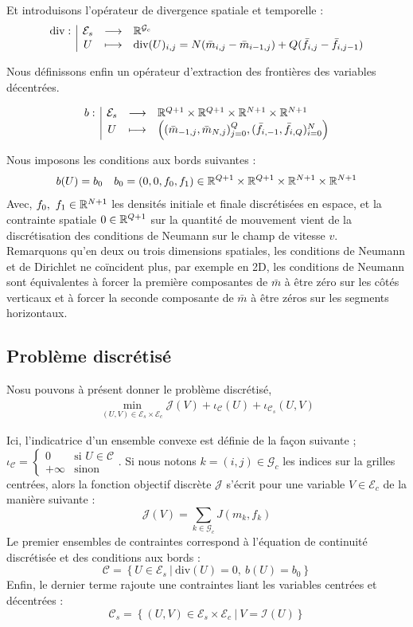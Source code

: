 \documentclass[a4paper,12pt]{article}
\renewcommand{\div}{\text{div}}
\begin{document}
Et introduisons l'opérateur de divergence spatiale et temporelle : 
\begin{align}
\fonction{\div}{\mathcal{E}_s}{\RR^{\mathcal{G}_c}}{U}{\div(U)_{i,j} = N(\bar{m}_{i,j} - \bar{m}_{i-1,j}) + Q(\bar{f}_{i,j} - \bar{f}_{i,j-1})
}
\end{align}

Nous définissons enfin un opérateur d'extraction des frontières des variables décentrées. 

\begin{align}
\begin{array}[t]{l|ccl} b: & \mathcal{E}_s & \longrightarrow & \mathbb{R}^{Q+1}\times\mathbb{R}^{Q+1}\times\mathbb{R}^{N+1}\times\mathbb{R}^{N+1} \\ & U & \longmapsto & \left( (\bar{m}_{-1,j},\bar{m}_{N,j})_{j=0}^Q,(\bar{f}_{i,-1},\bar{f}_{i,Q})_{i=0}^N \right) \end{array}
\end{align}


Nous imposons les conditions aux bords suivantes :
$$
b(U) = b_0\quad b_0=(0,0,f_0,f_1)\in \mathbb{R}^{Q+1}\times\mathbb{R}^{Q+1}\times\mathbb{R}^{N+1}\times\mathbb{R}^{N+1}
$$
Avec, $f_0,\ f_1\in\mathbb{R}^{N+1}$ les densités initiale et finale discrétisées en espace, et la contrainte spatiale $0\in\mathbb{R}^{Q+1}$ sur la quantité de mouvement vient de la discrétisation des conditions de Neumann sur le champ de vitesse $v$. \\
Remarquons qu'en deux ou trois dimensions spatiales, les conditions de Neumann et de Dirichlet ne coïncident plus,  par exemple en 2D, les conditions de Neumann sont équivalentes à forcer la première composantes de $\bar{m}$ à être zéro sur les côtés verticaux et à forcer la seconde composante de $\bar{m}$ à être zéros sur les segments horizontaux. 

\subsection{Problème discrétisé}

Nosu pouvons à présent donner le problème discrétisé, 
\begin{align}
\min_{(U,V)\in\mathcal{E}_s\times\mathcal{E}_c} \mathcal{J}(V) + \iota_{\mathcal{C}}(U) + \iota_{\mathcal{C}_s}(U,V)
\end{align}

Ici, l'indicatrice d'un ensemble convexe est définie de la façon suivante ; $ \iota_{\mathcal{C}}=\left\{\begin{array}{cl}
0 &\text{si } U\in\mathcal{C} \\
+\infty &\text{sinon }
\end{array}\right.$. Si nous notons $k=(i,j)\in\mathcal{G}_c$ les indices sur la grilles centrées, alors la fonction objectif discrète $\mathcal{J}$ s'écrit pour une variable $V\in\mathcal{E}_c$  de la manière suivante : 
$$
\mathcal{J}(V)=\sum_{k\in\mathcal{G}_c} J(m_k,f_k)
$$
Le premier ensembles de contraintes correspond à l'équation de continuité discrétisée et des conditions aux bords : 
$$
\mathcal{C}= \left\{ U\in \mathcal{E}_s\ |\ \div(U)=0,\ b(U) = b_0 \right\}
$$
Enfin, le dernier terme rajoute une contraintes liant les variables centrées et décentrées : 
$$
\mathcal{C}_s=\left\{(U,V)\in\mathcal{E}_s\times\mathcal{E}_c\ |\ V=\mathcal{I}(U)\right\}
$$
\end{document}
